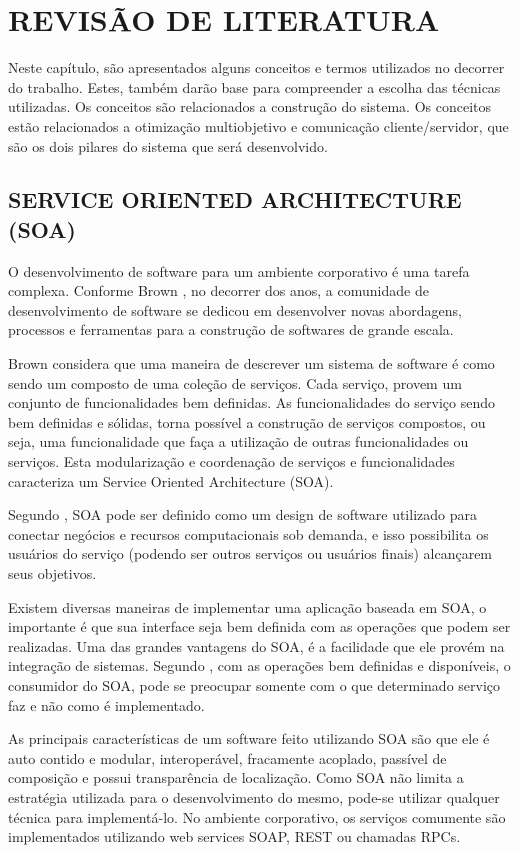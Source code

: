 \chapter{REVISÃO DE LITERATURA}
\label{chap:fundamentacaoTeorica}

Neste capítulo, são apresentados alguns conceitos e termos utilizados no decorrer do trabalho. 
Estes, também darão base para compreender a escolha das técnicas utilizadas. 
Os conceitos são relacionados a construção do sistema. 
Os conceitos estão relacionados a otimização multiobjetivo e comunicação cliente/servidor, 
que são os dois pilares do sistema que será desenvolvido.

\section{SERVICE ORIENTED ARCHITECTURE (SOA)}
O desenvolvimento de software para um ambiente corporativo é uma tarefa complexa. 
Conforme Brown \cite{brown}, no decorrer dos anos, a comunidade de desenvolvimento de software se 
dedicou em desenvolver novas abordagens, processos e ferramentas para a construção de softwares de 
grande escala. 

Brown considera que uma maneira de descrever um sistema de software é como sendo um composto de 
uma coleção de serviços. Cada serviço, provem um conjunto de funcionalidades bem definidas. 
As funcionalidades do serviço sendo bem definidas e sólidas, torna possível a construção de serviços 
compostos, ou seja, uma funcionalidade que faça a utilização de outras funcionalidades ou serviços. 
Esta modularização e coordenação de serviços e funcionalidades caracteriza um 
Service Oriented Architecture (SOA).

Segundo \cite{valipour}, SOA pode ser definido como um design de software utilizado para 
conectar negócios e recursos computacionais sob demanda, e isso possibilita os usuários 
do serviço (podendo ser outros serviços ou usuários finais) alcançarem seus objetivos. 

Existem diversas maneiras de implementar uma aplicação baseada em SOA, o importante é que 
sua interface seja bem definida com as operações que podem ser realizadas. 
Uma das grandes vantagens do SOA, é a facilidade que ele provém na integração de sistemas. 
Segundo \cite{valipour}, com as operações bem definidas e disponíveis, o consumidor do SOA, 
pode se preocupar somente com o que determinado serviço faz e não como é implementado.

As principais características de um software feito utilizando SOA são que ele é auto contido e 
modular, interoperável, fracamente acoplado, passível de composição e possui transparência de localização. 
Como SOA não limita a estratégia utilizada para o desenvolvimento do mesmo, pode-se utilizar qualquer 
técnica para implementá-lo. No ambiente corporativo, os serviços comumente são implementados 
utilizando web services SOAP, REST ou chamadas RPCs.

